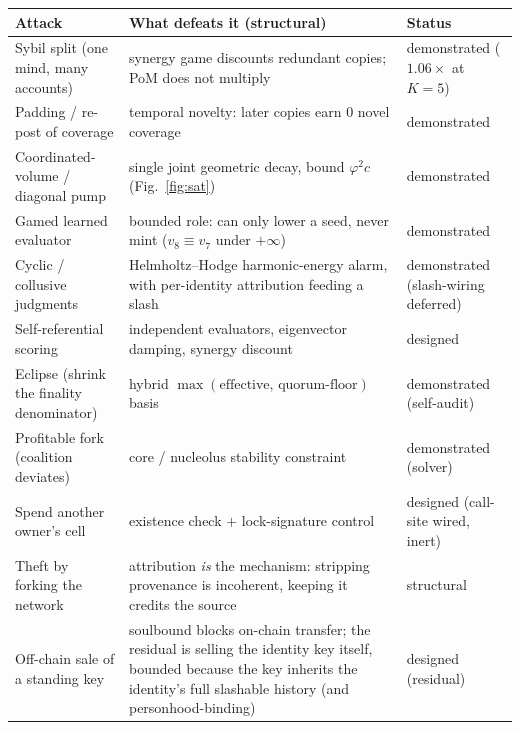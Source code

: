 \documentclass[10pt]{article}
\begin{document}
\begin{center}
\footnotesize
\begin{tabular}{@{}p{4.0cm}p{6.4cm}p{2.5cm}@{}}
\toprule
\textbf{Attack} & \textbf{What defeats it (structural)} & \textbf{Status} \\
\midrule
Sybil split (one mind, many accounts) & synergy game discounts redundant copies; PoM does not multiply & demonstrated ($1.06\times$ at $K{=}5$) \\
Padding / re-post of coverage & temporal novelty: later copies earn $0$ novel coverage & demonstrated \\
Coordinated-volume / diagonal pump & single joint geometric decay, bound $\varphi^{2}c$ (Fig.~\ref{fig:sat}) & demonstrated \\
Gamed learned evaluator & bounded role: can only lower a seed, never mint ($v_8\equiv v_7$ under $+\infty$) & demonstrated \\
Cyclic / collusive judgments & Helmholtz--Hodge harmonic-energy alarm, with per-identity attribution feeding a slash & demonstrated (slash-wiring deferred) \\
Self-referential scoring & independent evaluators, eigenvector damping, synergy discount & designed \\
Eclipse (shrink the finality denominator) & hybrid $\max(\text{effective},\,\text{quorum-floor})$ basis & demonstrated (self-audit) \\
Profitable fork (coalition deviates) & core / nucleolus stability constraint & demonstrated (solver) \\
Spend another owner's cell & existence check $+$ lock-signature control & designed (call-site wired, inert) \\
Theft by forking the network & attribution \emph{is} the mechanism: stripping provenance is incoherent, keeping it credits the source & structural \\
Off-chain sale of a standing key & soulbound blocks on-chain transfer; the residual is selling the identity key itself, bounded because the key inherits the identity's full slashable history (and personhood-binding) & designed (residual) \\
\bottomrule
\end{tabular}
\end{center}
\end{document}
